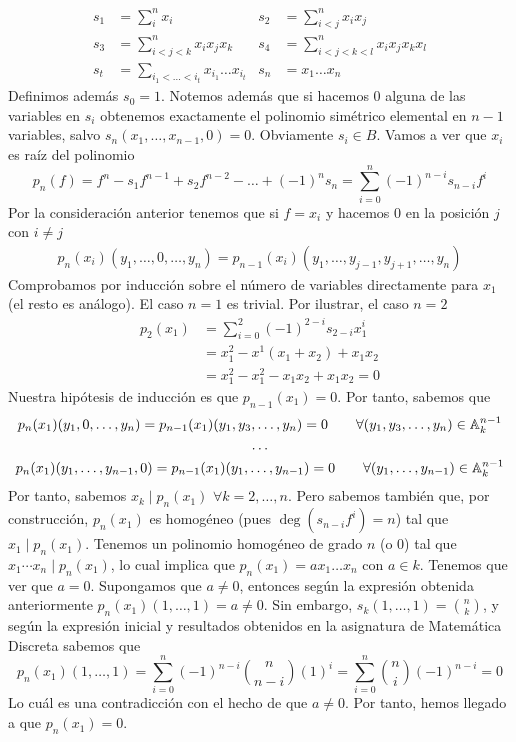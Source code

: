 \documentclass[twoside]{article}
\begin{document}
\begin{solucion}
\begin{itemize}
\begin{align*}
s_1 &= \sum_{i}^n x_i & s_2 &=  \sum_{i<j}^n x_i x_j\\
s_3 &= \sum_{i<j<k}^n x_ix_jx_k & s_4 &=  \sum_{i<j<k<l}^n x_i x_jx_kx_l\\
s_t &= \sum_{i_1<\dotsc<i_t}x_{i_1}\dotsc x_{i_t}  &  s_n &= x_1\dotsc x_n
\end{align*}
Definimos además $s_0 =1$. Notemos además que si hacemos $0$ alguna de las variables en $s_i$ obtenemos exactamente el polinomio simétrico elemental en $n-1$ variables, salvo $s_n(x_1,\dotsc,x_{n-1},0)=0$. Obviamente $s_i \in B$. Vamos a ver que $x_i$ es raíz del polinomio
$$
p_n(f) = f^n - s_1 f^{n-1} + s_2 f^{n-2} - \dotsc + (-1)^ns_n = \sum_{i=0}^n (-1)^{n-i}s_{n-i}f^i
$$
Por la consideración anterior tenemos que si $f=x_i$ y hacemos $0$ en la posición $j$ con $i\neq j$
\begin{gather*}
p_n(x_i)(y_1,\dotsc,0,\dotsc,y_{n}) = p_{n-1}(x_i)(y_1,\dotsc,y_{j-1},y_{j+1},\dotsc,y_{n})
\end{gather*}
Comprobamos por inducción sobre el número de variables directamente para $x_1$ (el resto es análogo). El caso $n=1$ es trivial. Por ilustrar, el caso $n=2$
\begin{align*}
p_2(x_1) &= \sum_{i=0}^2 (-1)^{2-i}s_{2-i}x_1^i \\
&= x_1^2 -x^1(x_1+x_2) + x_1x_2 \\
&= x_1^2 -x_1^2 -x_1x_2+x_1x_2 = 0
\end{align*}
Nuestra hipótesis de inducción es que $p_{n-1}(x_1) = 0$. Por tanto, sabemos que
\begin{gather*}
p_n(x_1)(y_1,0,\dotsc,y_{n}) = p_{n-1}(x_1)(y_1,y_3,\dotsc,y_{n})=0 \qquad \forall (y_1,y_3,\dotsc,y_{n})\in \mathbb{A}_k^{n-1}\\
\dotsc\\
p_n(x_1)(y_1,\dotsc,y_{n-1},0) = p_{n-1}(x_1)(y_1,\dotsc,y_{n-1}) = 0 \qquad \forall (y_1,\dotsc,y_{n-1})\in \mathbb{A}_k^{n-1}
\end{gather*}
Por tanto, sabemos $x_k \mid p_n(x_1)$ $\forall k =2,\dotsc,n$. Pero sabemos también que, por construcción, $p_n(x_1)$ es homogéneo (pues $\deg(s_{n-i}f^i)= n$) tal que $x_1 \mid p_n(x_1)$. Tenemos un polinomio homogéneo de grado $n$ (o $0$) tal que $x_1\cdots x_n \mid p_n(x_1)$, lo cual implica que $p_n(x_1) = ax_1\dotsc x_n$ con $a\in k$. Tenemos que ver que $a=0$. Supongamos que $a\neq 0$, entonces según la expresión obtenida anteriormente $p_n(x_1)(1,\dotsc,1) = a\neq 0$. Sin embargo, $s_k(1,\dotsc,1) = \binom{n}{k}$, y según la expresión inicial y resultados obtenidos en la asignatura de Matemática Discreta sabemos que 
$$
p_n(x_1)(1,\dotsc,1) = \sum_{i=0}^n (-1)^{n-i}\binom{n}{n-i}(1)^i = \sum_{i=0}^n \binom{n}{i}(-1)^{n-i} = 0
$$
Lo cuál es una contradicción con el hecho de que $a\neq 0$. Por tanto, hemos llegado a que $p_n(x_1)=0$.
\end{itemize} 
\end{solucion}
\end{document}
